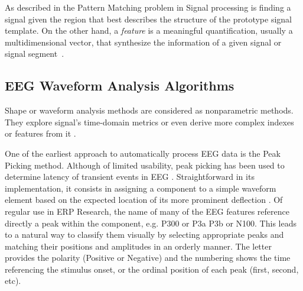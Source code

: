 \documentclass[brainsci,article,submit,moreauthors,pdftex,10pt,a4paper]{mdpi}
\begin{document}
As described in \citep{allen2004signal} the Pattern Matching problem in Signal processing is finding a signal given the region that best describes the structure of the prototype signal template.   On the other hand, a \textit{feature} is a meaningful quantification, usually a multidimensional vector, that synthesize the information of a given signal or signal segment~\citep{WolpawJonathanR2012}.   

\subsection{EEG Waveform Analysis Algorithms}
\label{Algorithms}

Shape or waveform analysis methods are considered as nonparametric methods.  They explore signal's time-domain metrics or even derive more complex indexes or features from it \citep{Thakor2009}. 

One of the earliest approach to automatically process EEG data is the Peak Picking method.  Although of limited usability, peak picking has been used to determine latency of transient events in EEG \citep{Jaskowski2000,Zhang2011}.  Straightforward in its implementation, it consists in assigning a component to a simple waveform element based on the expected location of its more prominent deflection \citep{Ouyang2017}.  
Of regular use in ERP Research, the name of many of the EEG features reference directly a peak within the component, e.g. P300 or P3a P3b or N100.  This leads to a natural way to classify them visually by selecting appropriate peaks and matching their positions and amplitudes in an orderly manner.  The letter provides the polarity (Positive or Negative) and the numbering shows the time referencing the stimulus onset, or the ordinal position of each peak (first, second, etc). 

\end{document}
